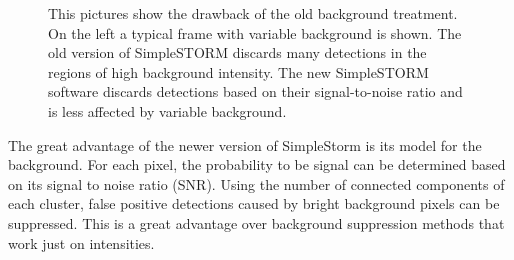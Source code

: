 \begin{figure}
\hfill
{}\hfill	
{}

\caption{This pictures show the drawback of the old background treatment. On the left a typical frame with variable background is shown. The old version of SimpleSTORM discards many detections in the regions of high background intensity. The new SimpleSTORM software discards detections based on their signal-to-noise ratio and is less affected by variable background.}
\label{bgmakesitbad}	

\end{figure}

The great advantage of the newer version of SimpleStorm is its model for the background. For each pixel, the probability to be signal can be determined based on its signal to noise ratio (SNR). Using the number of connected components of each cluster, false positive detections caused by bright background pixels can be suppressed. This is a great advantage over background suppression methods that work just on intensities.

